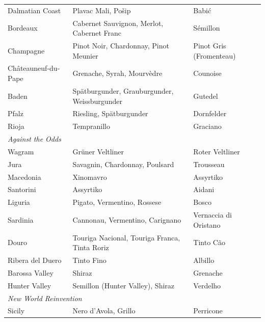\documentclass[11pt]{article}
\begin{document}
\begin{small}
\begin{longtable}{p{3.5cm} p{6cm} p{3cm}}
Dalmatian Coast      & Plavac Mali, Po\v{s}ip                                       & Babi\'c \\
Bordeaux             & Cabernet Sauvignon, Merlot, Cabernet Franc                   & S\'emillon \\
Champagne            & Pinot Noir, Chardonnay, Pinot Meunier                        & Pinot Gris (Fromenteau) \\
Ch\^ateauneuf-du-Pape & Grenache, Syrah, Mourv\`edre                                & Counoise \\
Baden                & Spätburgunder, Grauburgunder, Weissburgunder                 & Gutedel \\
Pfalz                & Riesling, Spätburgunder                                      & Dornfelder \\
Rioja                & Tempranillo                                                  & Graciano \\
\midrule
\multicolumn{3}{l}{\textit{Against the Odds}} \\
Wagram               & Gr\"uner Veltliner                                           & Roter Veltliner \\
Jura                 & Savagnin, Chardonnay, Poulsard                               & Trousseau \\
Macedonia            & Xinomavro                                                    & Assyrtiko \\
Santorini            & Assyrtiko                                                    & Aidani \\
Liguria              & Pigato, Vermentino, Rossese                                  & Bosco \\
Sardinia             & Cannonau, Vermentino, Carignano                              & Vernaccia di Oristano \\
Douro                & Touriga Nacional, Touriga Franca, Tinta Roriz                & Tinto C\~ao \\
Ribera del Duero     & Tinto Fino                                                   & Albillo \\
Barossa Valley       & Shiraz                                                       & Grenache \\
Hunter Valley        & Semillon (Hunter Valley), Shiraz                             & Verdelho \\
\midrule
\multicolumn{3}{l}{\textit{New World Reinvention}} \\
Sicily               & Nero d'Avola, Grillo                                         & Perricone \\

\end{longtable}
\end{small}
\end{document}

